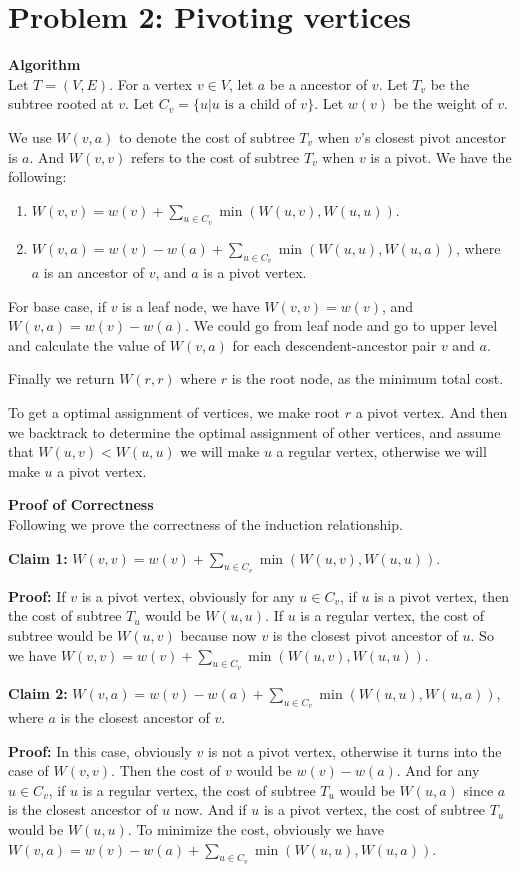 \documentclass{article}
\newcommand{\Proof}{\vspace{0.3cm} \noindent\textbf{Proof of Correctness} \vspace{0.2cm} \\}
\newcommand{\Algorithm}{\textbf{Algorithm} \vspace{0.2cm}\\}
\begin{document}
\section*{Problem 2: Pivoting vertices}
\Algorithm
Let $T = (V, E)$. For a vertex $v \in V$, let $a$ be a ancestor of $v$. Let $T_v$ be the subtree
rooted at $v$. Let $C_v = \{u | u \text{ is a child of } v\}$. Let $w(v)$ be the weight of $v$.

We use $W(v, a)$ to denote the cost of subtree $T_v$ when $v$'s closest pivot ancestor is
$a$. And $W(v, v)$ refers to the cost of subtree $T_v$ when $v$ is a pivot.   
We have the following:
\begin{enumerate}
  \item $W(v, v) = w(v) + \sum_{u \in C_v} \min(W(u, v), W(u, u))$. 
  \item $W(v, a) = w(v) - w(a) + \sum_{u \in C_v} \min( W(u, u), W(u, a))$, where $a$ is an ancestor of
    $v$, and $a$ is a pivot vertex.
\end{enumerate}

For base case, if $v$ is a leaf node, we have $W(v, v) = w(v)$, and $W(v, a) = w(v) - w(a)$. We
could go from leaf node and go to upper level and calculate the value of $W(v, a)$ for each
descendent-ancestor pair $v$ and $a$. 

Finally we return $W(r, r)$ where $r$ is the root node, as the minimum total cost.

To get a optimal assignment of vertices, we make root $r$ a pivot vertex. And then we backtrack
to determine the optimal assignment of other vertices, and assume that $W(u, v) < W(u, u)$ we will
make $u$ a regular vertex, otherwise we will make $u$ a pivot vertex.  
 
\Proof
Following we prove the correctness of the induction relationship. 

\textbf{Claim 1:}
$W(v, v) = w(v) + \sum_{u \in C_v} \min(W(u, v), W(u, u))$. 

\textbf{Proof:}
If $v$ is a pivot vertex, obviously for any $u \in C_v$, if $u$ is a pivot vertex,
then the cost of subtree $T_u$ would be $W(u, u)$. If $u$ is a regular vertex, the cost of subtree
would be $W(u, v)$ because now $v$ is the closest pivot ancestor of $u$. So we have 
$W(v, v) = w(v) + \sum_{u \in C_v} \min(W(u, v), W(u, u))$. 

\textbf{Claim 2:}
 $W(v, a) = w(v) - w(a) + \sum_{u \in C_v} \min( W(u, u), W(u, a))$, where $a$ is the closest ancestor of
 $v$.

\textbf{Proof:}
In this case, obviously $v$ is not a pivot vertex, otherwise it turns into the case of $W(v, v)$.
Then the cost of $v$ would be $w(v) - w(a)$. And for any $u \in C_v$, if $u$ is a regular vertex,
the cost of subtree $T_u$ would be $W(u, a)$ since $a$ is the closest ancestor of $u$ now. And if 
$u$ is a pivot vertex, the cost of subtree $T_u$ would be $W(u, u)$. To minimize the cost, obviously we have  
$W(v, a) = w(v) - w(a) + \sum_{u \in C_v} \min( W(u, u), W(u, a))$.
\end{document}
